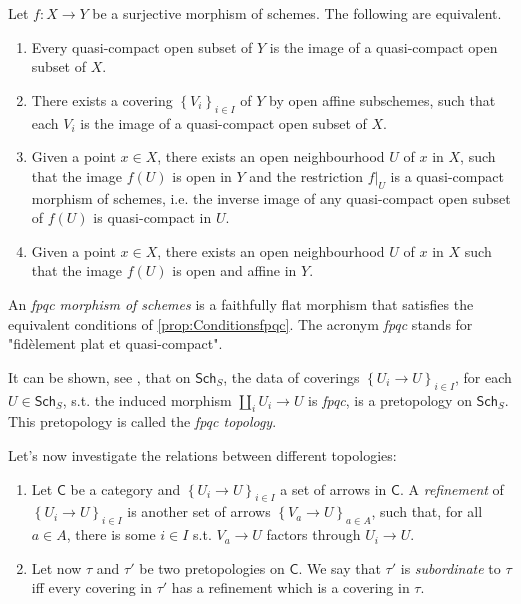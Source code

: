 \documentclass[../Main]{subfiles}
\begin{document}
\begin{prop}\label{prop:Conditionsfpqc}
	Let $f\colon X \to Y$ be a surjective morphism of schemes. The following are equivalent.
\begin{enumerate}
	\item Every quasi-compact open subset of $Y$ is the image of a quasi-compact
		open subset of $X$.
	\item There exists a covering $\left\{ V_i \right\}_{i \in I}$ of $Y$ by open affine 
		subschemes, such that each $V_i$ is the image of a quasi-compact
		open subset of $X$.
	\item Given a point $x \in X$, there exists an open neighbourhood $U$ of $x$
		in $X$, such that the image $f(U)$ is open in $Y$ and the restriction
		$\left.f\right|_{U}$ is a quasi-compact morphism of schemes, i.e.
		the inverse image of any quasi-compact open subset of $f(U)$ is
		quasi-compact in $U$.
	\item Given a point $x \in X$, there exists an open neighbourhood $U$ of $x$
		in $X$ such that the image $f(U)$ is open and affine in $Y$.
\end{enumerate}
\end{prop}


\begin{defn}
	An {\em fpqc morphism of schemes} is a faithfully flat morphism
	that satisfies the equivalent conditions of \cref{prop:Conditionsfpqc}.
	The acronym {\em fpqc} stands for "fidèlement plat et quasi-compact".
\end{defn}


\begin{rem}
	It can be shown, see \cite[\S 2.3.2]{Vistoli},
	that on $\mathsf{Sch}_{ S }$, the data
	of coverings $\left\{ U_{ i } \to U \right\}_{ i \in I }$, for each $U \in \mathsf{Sch}_{ S }$,
	s.t. the induced morphism $\amalg_i U_i \to U$ is {\em fpqc},
	is a pretopology on $\mathsf{Sch}_{ S }$.
	This pretopology is called the {\em fpqc topology}.
\end{rem}


\noindent
Let's now investigate the relations between different topologies:
\begin{defn}\leavevmode\vspace{-\baselineskip}
\begin{enumerate}
\item Let $\mathsf{C}$ be a category and $\left\{ U_{ i } \to U \right\}_{ i \in I }$
	a set of arrows in $\mathsf{C}$.
	A {\em refinement} of $\left\{ U_{ i } \to U \right\}_{ i \in I }$ is
	another set of arrows $\left\{ V_{ a } \to U \right\}_{ a \in A }$,
	such that, for all $a \in A$, there is some $i \in I$ s.t.
	$V_a \to U$ factors through $U_i \to U$.


\item Let now $\tau$ and $\tau'$ be two pretopologies on $\mathsf{C}$.
	We say that $\tau'$ is {\em subordinate} to $\tau$ iff
	every covering in $\tau'$ has a refinement which is
	a covering in $\tau$.
\end{enumerate}
\end{defn}
\end{document}
